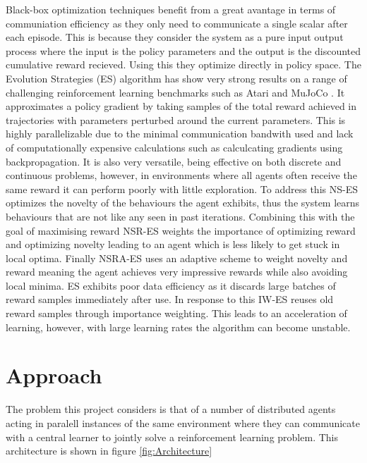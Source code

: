 Black-box optimization techniques benefit from a great avantage in terms of communiation efficiency as they only need to communicate a single scalar after each episode. This is because they consider the system as a pure input output process where the input is the policy parameters and the output is the discounted cumulative reward recieved. Using this they optimize directly in policy space.
The Evolution Strategies (ES) \cite{ES} algorithm has show very strong results on a range of challenging reinforcement learning benchmarks such as Atari \cite{Atari} and MuJoCo \cite{MuJoCo}. It approximates a policy gradient by taking samples of the total reward achieved in trajectories with parameters perturbed around the current parameters. This is highly parallelizable due to the minimal communication bandwith used and lack of computationally expensive calculations such as calculcating gradients using backpropagation. It is also very versatile, being effective on both discrete and continuous problems, however, in environments where all agents often receive the same reward it can perform poorly with little exploration. 
To address this NS-ES \cite{NS-ES} optimizes the novelty of the behaviours the agent exhibits, thus the system learns behaviours that are not like any seen in past iterations. Combining this with the goal of maximising reward NSR-ES weights the importance of optimizing reward and optimizing novelty leading to an agent which is less likely to get stuck in local optima. Finally NSRA-ES uses an adaptive scheme to weight novelty and reward meaning the agent achieves very impressive rewards while also avoiding local minima.
ES exhibits poor data efficiency as it discards large batches of reward samples immediately after use. In response to this IW-ES \cite{IWES} reuses old reward samples through importance weighting. This leads to an acceleration of learning, however, with large learning rates the algorithm can become unstable.



\section{Approach}
The problem this project considers is that of a number of distributed agents acting in paralell instances of the same environment where they can communicate with a central learner to jointly solve a reinforcement learning problem. 
This architecture is shown in figure \ref{fig:Architecture}

